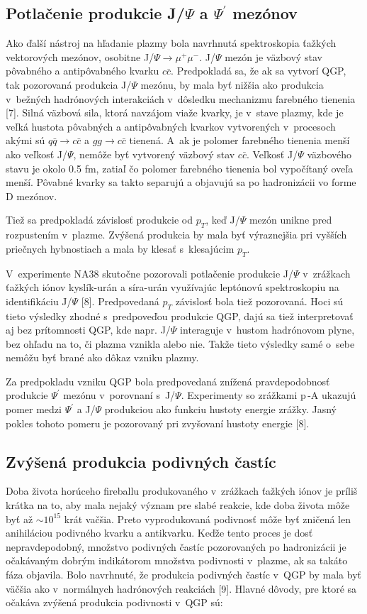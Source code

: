 \subsection{Potlačenie produkcie J/$\Psi$ a $\Psi^{'}$ mezónov}
Ako ďalší nástroj na hľadanie plazmy bola navrhnutá
spektroskopia ťažkých vektorových mezónov, osobitne J/$\Psi
\longrightarrow \mu^{+} \mu^{-}$. J/$\Psi$ mezón je väzbový stav
pôvabného a antipôvabného kvarku $c\bar{c}$. Predpokladá sa, že
ak sa vytvorí QGP, tak pozorovaná produkcia J/$\Psi$ mezónu, by mala
byť nižšia ako produkcia v~bežných hadrónových
interakciách v~dôsledku mechanizmu farebného tienenia [7]. Silná
väzbová sila, ktorá navzájom viaže kvarky, je v~stave plazmy,
kde je veľká hustota pôvabných a antipôvabných kvarkov
vytvorených v~procesoch akými sú $q\bar{q} \rightarrow c\bar{c}$ a $gg
\rightarrow c\bar{c}$ tienená.
A~ak je polomer farebného tienenia menší ako veľkosť
J/$\Psi$, nemôže byť vytvorený väzbový stav $c\bar{c}$.
Veľkosť J/$\Psi$ väzbového stavu je okolo 0.5 fm, zatiaľ
čo polomer farebného tienenia  bol vypočítaný oveľa
menší. Pôvabné kvarky sa takto separujú a objavujú sa po
hadronizácii vo forme D mezónov.

Tiež sa predpokladá závislosť produkcie od $p_{T}$, keď
 J/$\Psi$  mezón unikne pred rozpustením v~plazme.
Zvýšená produkcia by mala byť výraznejšia pri
vyšších priečnych hybnostiach a mala by klesať
s~klesajúcim $p_{T}$.

V~experimente NA38 skutočne pozorovali potlačenie produkcie
J/$\Psi$  v~zrážkach ťažkých iónov kyslík-urán a
síra-urán využívajúc leptónovú spektroskopiu na
identifikáciu J/$\Psi$ [8]. Predpovedaná $p_{T}$ závislosť bola
tiež pozorovaná. Hoci sú tieto výsledky zhodné s~predpoveďou
produkcie QGP, dajú sa tiež interpretovať aj bez prítomnosti
QGP, kde napr. J/$\Psi$ interaguje v~hustom hadrónovom plyne,
bez ohľadu na to, či plazma vznikla alebo nie. Takže tieto
výsledky samé o~sebe nemôžu byť brané ako dôkaz vzniku
plazmy.

Za predpokladu vzniku QGP bola predpovedaná znížená
pravdepodobnosť produkcie  $\Psi^{'}$ mezónu v~porovnaní
s~J/$\Psi$.
Experimenty so zrážkami p$\,$-A  ukazujú pomer medzi $\Psi^{'}$ a
J/$\Psi$ produkciou ako funkciu hustoty energie zrážky. Jasný pokles
tohoto pomeru je pozorovaný pri zvyšovaní hustoty energie [8].

\newpage \subsection{Zvýšená produkcia podivných častíc}
Doba života horúceho fireballu produkovaného v~zrážkach ťažkých
iónov je príliš krátka na to, aby mala
nejaký význam pre slabé reakcie, kde doba života môže byť
až $\sim 10^{15}$ krát vačšia. Preto vyprodukovaná
podivnosť môže byť zničená len anihiláciou podivného
kvarku a antikvarku. Keďže tento proces je dosť
nepravdepodobný, množstvo podivných častíc  pozorovaných
po hadronizácii je očakávaným dobrým indikátorom množstva
podivnosti  v~plazme, ak sa takáto fáza objavila.
Bolo navrhnuté, že produkcia podivných častíc v~QGP by mala
byť väčšia ako v~normálnych hadrónových reakciách [9].
Hlavné dôvody, pre ktoré sa očakáva zvýšená produkcia
podivnosti v~QGP sú:


